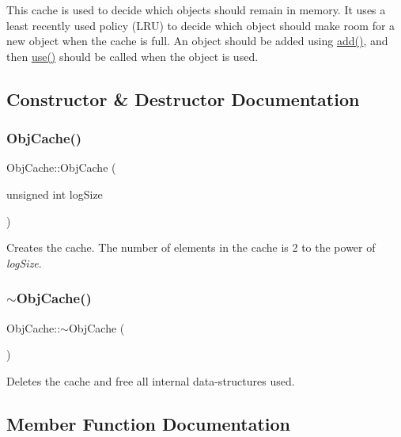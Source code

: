 This cache is used to decide which objects should remain in memory. It uses a least recently used policy (L\+RU) to decide which object should make room for a new object when the cache is full. An object should be added using \mbox{\hyperlink{class_obj_cache_affd025326493c40ac4e7f5b4c0c3ad9b}{add()}}, and then \mbox{\hyperlink{class_obj_cache_ac4d9eb810e8f6ca2fbd4cf058ff3fe0e}{use()}} should be called when the object is used. 

\subsection{Constructor \& Destructor Documentation}
\mbox{\label{class_obj_cache_a1818fcc2b39a5c54a6e2bd9b456b7ccb}} 
\subsubsection{\texorpdfstring{ObjCache()}{ObjCache()}}
{\footnotesize\ttfamily Obj\+Cache\+::\+Obj\+Cache (\begin{DoxyParamCaption}\item[{unsigned int}]{log\+Size }\end{DoxyParamCaption})}

Creates the cache. The number of elements in the cache is 2 to the power of {\itshape log\+Size}. \mbox{\label{class_obj_cache_ae2ea95b2c63b154dd0a068613ba06aff}} 
\subsubsection{\texorpdfstring{$\sim$ObjCache()}{~ObjCache()}}
{\footnotesize\ttfamily Obj\+Cache\+::$\sim$\+Obj\+Cache (\begin{DoxyParamCaption}{ }\end{DoxyParamCaption})}

Deletes the cache and free all internal data-\/structures used. 

\subsection{Member Function Documentation}
\mbox{\label{class_obj_cache_affd025326493c40ac4e7f5b4c0c3ad9b}} 
